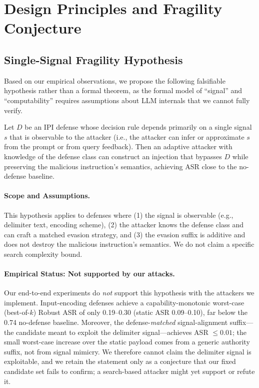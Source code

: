 \section{Design Principles and Fragility Conjecture}
\label{sec:principles}

\subsection{Single-Signal Fragility Hypothesis}

Based on our empirical observations, we propose the following falsifiable hypothesis rather than a formal theorem, as the formal model of ``signal'' and ``computability'' requires assumptions about LLM internals that we cannot fully verify.

\begin{conjecture}
\label{conj:single}
Let $D$ be an IPI defense whose decision rule depends primarily on a single signal $s$ that is observable to the attacker (i.e., the attacker can infer or approximate $s$ from the prompt or from query feedback). Then an adaptive attacker with knowledge of the defense class can construct an injection that bypasses $D$ while preserving the malicious instruction's semantics, achieving ASR close to the no-defense baseline.
\end{conjecture}

\paragraph{Scope and Assumptions.} This hypothesis applies to defenses where (1) the signal is observable (e.g., delimiter text, encoding scheme), (2) the attacker knows the defense class and can craft a matched evasion strategy, and (3) the evasion suffix is additive and does not destroy the malicious instruction's semantics. We do not claim a specific search complexity bound.

\paragraph{Empirical Status: Not supported by our attacks.} Our end-to-end experiments do \emph{not} support this hypothesis with the attackers we implement. Input-encoding defenses achieve a capability-monotonic worst-case (best-of-$k$) Robust ASR of only 0.19--0.30 (static ASR 0.09--0.10), far below the 0.74 no-defense baseline. Moreover, the defense-\emph{matched} signal-alignment suffix---the candidate meant to exploit the delimiter signal---achieves ASR $\leq 0.01$; the small worst-case increase over the static payload comes from a generic authority suffix, not from signal mimicry. We therefore cannot claim the delimiter signal is exploitable, and we retain the statement only as a conjecture that our fixed candidate set fails to confirm; a search-based attacker might yet support or refute it.

